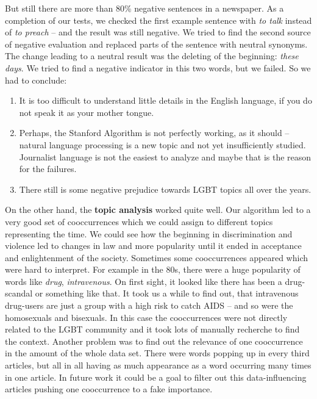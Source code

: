 \documentclass[10pt,a4paper,twocolumn]{scrartcl}
\begin{document}
But still there are more than 80\% negative sentences in a newspaper. As a completion of our tests, we checked the first example sentence with \textit{to talk} instead of \textit{to preach} -- and the result was still negative. We tried to find the second source of negative evaluation and replaced parts of the sentence with neutral synonyms. The change leading to a neutral result was the deleting of the beginning: \textit{these days}. We tried to find a negative indicator in this two words, but we failed. So we had to conclude:
\begin{enumerate}
\item It is too difficult to understand little details in the English language, if you do not speak it as your mother tongue.
\item Perhaps, the Stanford Algorithm is not perfectly working, as it should – natural language processing is a new topic and not yet insufficiently studied. Journalist language is not the easiest to analyze and maybe that is the reason for the failures.
\item There still is some negative prejudice towards LGBT topics all over the years.
\end{enumerate}

On the other hand, the \textbf{topic analysis} worked quite well. Our algorithm led to a very good set of cooccurrences which we could assign to different topics representing the time. We could see how the beginning in discrimination and violence led to changes in law and more popularity until it ended in acceptance and enlightenment of the society. Sometimes some cooccurrences appeared which were hard to interpret. For example in the 80s, there were a huge popularity of words like \textit{drug}, \textit{intravenous}. On first sight, it looked like there has been a drug-scandal or something like that. It took us a while to find out, that intravenous drug-users are just a group with a high risk to catch AIDS -- and so were the homosexuals and bisexuals. In this case the cooccurrences were not directly related to the LGBT community and it took lots of manually recherche to find the context. Another problem was to find out the relevance of one cooccurrence in the amount of the whole data set. There were words popping up in every third articles, but all in all having as much appearance as a word occurring many times in one article. In future work it could be a goal to filter out this data-influencing articles pushing one cooccurrence to a fake importance.
\end{document}
